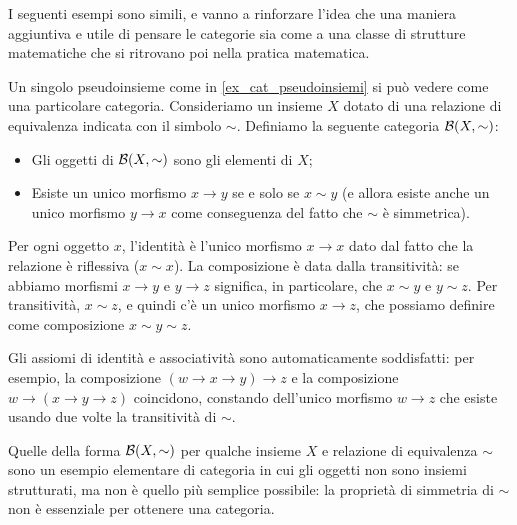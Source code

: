 I seguenti esempi sono simili, e vanno a rinforzare l'idea che una maniera aggiuntiva e utile di pensare le categorie sia come a una classe di strutture matematiche che si ritrovano poi nella pratica matematica.%
\begin{example}\label{ex_cat_rel_equiv}
	Un singolo pseudoinsieme come in \ref{ex_cat_pseudoinsiemi} si può vedere come una particolare categoria. Consideriamo un insieme \(X\) dotato di una relazione di equivalenza indicata con il simbolo \(\sim\).
	Definiamo la seguente categoria \(\mathcal{B}(X,\sim)\):
	\begin{itemize}
		\item Gli oggetti di \(\mathcal{B}(X,\sim)\) sono gli elementi di \(X\);
		\item Esiste un unico morfismo \(x\to y\) se e solo se \(x\sim y\) (e allora esiste anche un unico morfismo \(y\to x\) come conseguenza del fatto che \(\sim\) è simmetrica).
	\end{itemize}
	Per ogni oggetto \(x\), l'identità è l'unico morfismo \(x\to x\) dato dal fatto che la relazione è riflessiva (\(x\sim x\)).
	La composizione è data dalla transitività: se abbiamo morfismi \(x\to y\) e \(y\to z\) significa, in particolare, che \(x\sim y\) e \(y\sim z\). Per transitività, \(x\sim z\), e quindi c'è un unico morfismo \(x\to z\), che possiamo definire come composizione \(x\sim y\sim z\).

	Gli assiomi di identità e associatività sono automaticamente soddisfatti: per esempio, la composizione \((w\to x\to y)\to z\) e la composizione \(w\to (x\to y\to z)\) coincidono, constando dell'unico morfismo \(w\to z\) che esiste usando due volte la transitività di \(\sim\).
\end{example}
Quelle della forma \(\mathcal{B}(X,\sim)\) per qualche insieme \(X\) e relazione di equivalenza \(\sim\) sono un esempio elementare di categoria in cui gli oggetti non sono insiemi strutturati, ma non è quello più semplice possibile: la proprietà di simmetria di \(\sim\) non è essenziale per ottenere una categoria.

